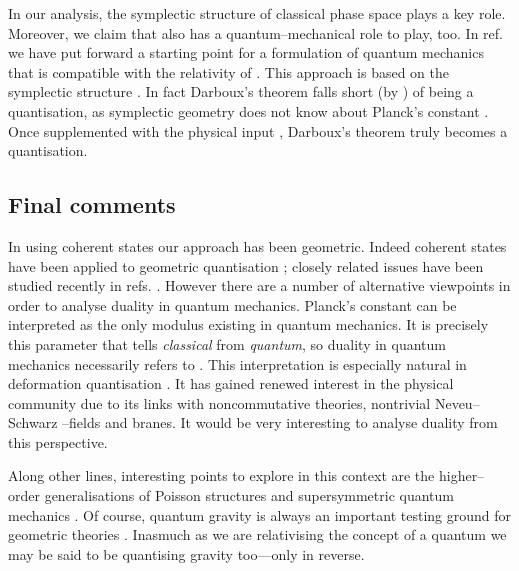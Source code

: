 \documentclass[a4paper,a4paper]{article}
\begin{document}
In our analysis, the symplectic structure of classical phase space \coordHE{} 
plays a key role. Moreover, we claim that \coordHE{} also has a quantum--mechanical 
role to play, too. In ref. \cite{STATEMENT} we have  put forward a starting point for a 
formulation of quantum mechanics that is compatible with the relativity of \myHighlight{$\hbar$}\coordHE{}. 
This approach is based on the symplectic structure \coordHE{}. In 
fact Darboux's theorem falls short (by \myHighlight{$\hbar$}\coordHE{}) of being a quantisation, as
symplectic geometry does not know about Planck's constant \myHighlight{$\hbar$}\coordHE{}. 
Once supplemented with the physical input \myHighlight{$\hbar$}\coordHE{}, Darboux's theorem truly becomes 
a quantisation. 

\subsection{Final comments}\label{comm}

In using coherent states our approach has been geometric. 
Indeed coherent states have been applied to geometric quantisation 
\cite{GQCS}; closely related issues have been studied recently in 
refs. \cite{HALL, ZA, FUJII, TORONTO}.
However there are a number of alternative viewpoints in order
to analyse duality in quantum mechanics. Planck's constant \myHighlight{$\hbar$}\coordHE{} 
can be interpreted as the only modulus existing in quantum mechanics. 
It is precisely this parameter that tells {\it classical}\/ from {\it quantum}, 
so duality in quantum mechanics necessarily refers to \myHighlight{$\hbar$}\coordHE{}.  
This interpretation is especially natural in deformation quantisation 
\cite{BEREZIN, SCHLICHENMAIER, GARCIA}. It has gained renewed interest 
in the physical community due to its links with noncommutative theories, 
nontrivial Neveu--Schwarz \coordHE{}--fields and branes. It would be very interesting 
to analyse duality from this perspective. 

Along other lines, interesting points to explore in this context are the 
higher--order generalisations of Poisson structures \cite{AZCA} and 
supersymmetric quantum mechanics \cite{RRAGA}. Of course, quantum gravity is 
always an important testing ground for geometric theories \cite{JANAN, THIEMANN, WAT, RAD}. 
Inasmuch as we are relativising the concept of a quantum we may be said
to be quantising gravity too---only in reverse.
\end{document}
